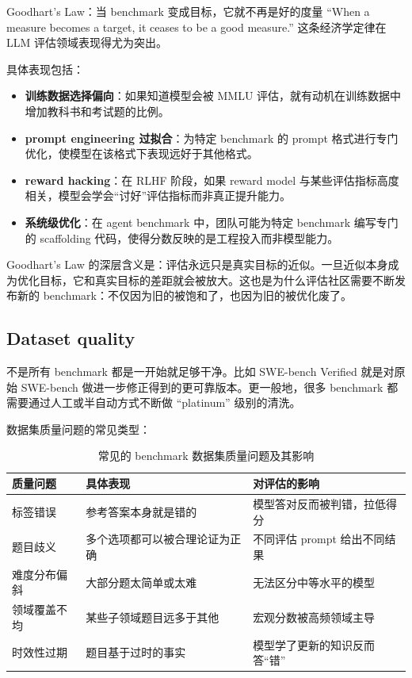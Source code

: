 \documentclass[a4paper]{article}
\begin{document}
\begin{warningbox}{Goodhart's Law：当 benchmark 变成目标，它就不再是好的度量}
``When a measure becomes a target, it ceases to be a good measure.'' 这条经济学定律在 LLM 评估领域表现得尤为突出。

具体表现包括：
\begin{itemize}
    \item \textbf{训练数据选择偏向}：如果知道模型会被 MMLU 评估，就有动机在训练数据中增加教科书和考试题的比例。
    \item \textbf{prompt engineering 过拟合}：为特定 benchmark 的 prompt 格式进行专门优化，使模型在该格式下表现远好于其他格式。
    \item \textbf{reward hacking}：在 RLHF 阶段，如果 reward model 与某些评估指标高度相关，模型会学会``讨好''评估指标而非真正提升能力。
    \item \textbf{系统级优化}：在 agent benchmark 中，团队可能为特定 benchmark 编写专门的 scaffolding 代码，使得分数反映的是工程投入而非模型能力。
\end{itemize}

Goodhart's Law 的深层含义是：评估永远只是真实目标的近似。一旦近似本身成为优化目标，它和真实目标的差距就会被放大。这也是为什么评估社区需要不断发布新的 benchmark：不仅因为旧的被饱和了，也因为旧的被优化废了。
\end{warningbox}

\subsection{Dataset quality}

不是所有 benchmark 都是一开始就足够干净。比如 SWE-bench Verified 就是对原始 SWE-bench 做进一步修正得到的更可靠版本。更一般地，很多 benchmark 都需要通过人工或半自动方式不断做 ``platinum'' 级别的清洗。

数据集质量问题的常见类型：

\begin{table}[H]
\centering
\begin{tabular}{p{3.0cm}p{4.5cm}p{5.5cm}}
\toprule
\textbf{质量问题} & \textbf{具体表现} & \textbf{对评估的影响} \\
\midrule
标签错误 & 参考答案本身就是错的 & 模型答对反而被判错，拉低得分 \\
题目歧义 & 多个选项都可以被合理论证为正确 & 不同评估 prompt 给出不同结果 \\
难度分布偏斜 & 大部分题太简单或太难 & 无法区分中等水平的模型 \\
领域覆盖不均 & 某些子领域题目远多于其他 & 宏观分数被高频领域主导 \\
时效性过期 & 题目基于过时的事实 & 模型学了更新的知识反而答``错'' \\
\bottomrule
\end{tabular}
\caption{常见的 benchmark 数据集质量问题及其影响}
\end{table}
\end{document}
